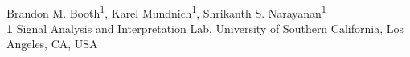 \documentclass[10pt,letterpaper]{article}
\date{}
\begin{document}
\vspace*{0.2in}

\begin{flushleft}
{\Large
\textbf{} %
}
\newline
\\
Brandon M. Booth\textsuperscript{1},
Karel Mundnich\textsuperscript{1},
Shrikanth S. Narayanan\textsuperscript{1}
\\
\bigskip
\textbf{1} Signal Analysis and Interpretation Lab, University of Southern California, Los Angeles, CA, USA
\\
\bigskip
\end{flushleft}
\end{document}
